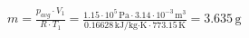 \( m = \frac{p_{avg} \cdot V_1}{R \cdot T_1} = \frac{1.15 \cdot 10^5 \, \text{Pa} \cdot 3.14 \cdot 10^{-3} \, \text{m}^3}{0.16628 \, \text{kJ/kg·K} \cdot 773.15 \, \text{K}} = 3.635 \, \text{g} \)